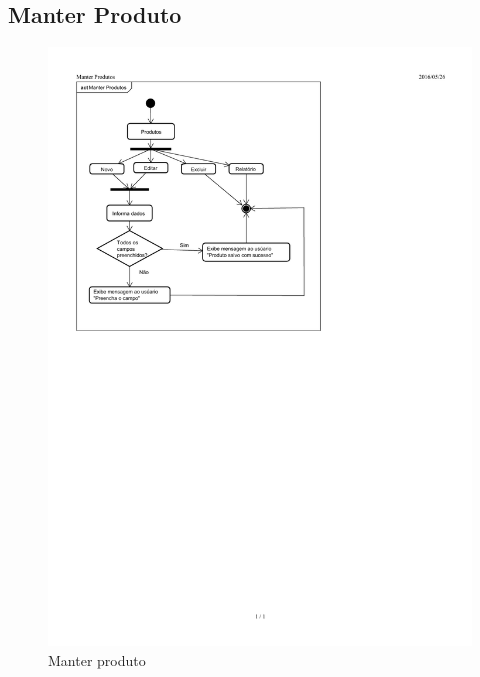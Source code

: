 \documentclass[chapter=TITLE,12pt,oneside,a4paper,english,french,sumario=tradicional,spanish,brazil,]{abntex2}
\begin{document}
\subsection{Manter Produto}
\begin{figure}[h]\centering
	\includegraphics[scale=1.48]{produto.pdf}\caption{Manter produto}
\end{figure}

\newpage
\end{document}
